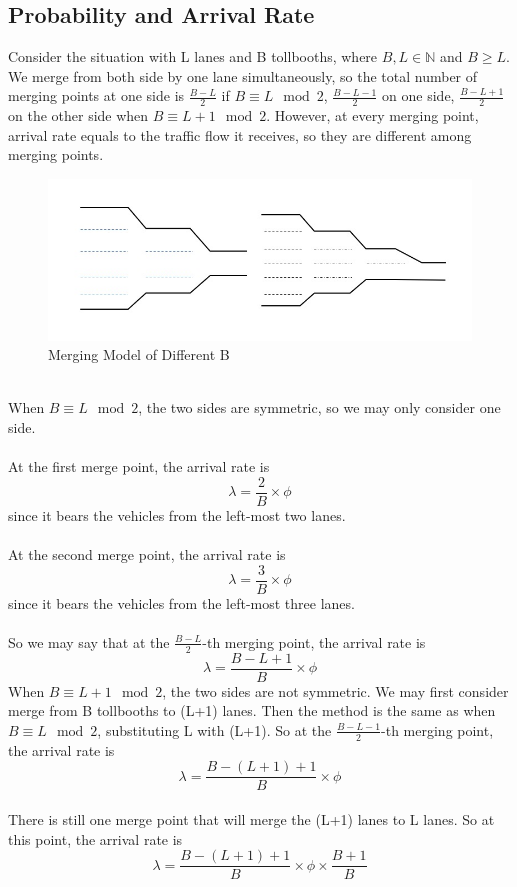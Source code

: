 \subsection{Probability and Arrival Rate}
Consider the situation with L lanes and B tollbooths, where \(B, L \in \mathbb{N}\) and \(B\geqslant L\). We merge from both side by one lane simultaneously, so the total number of merging points at one side is \(\frac{B-L}{2}\) if \(B \equiv L \mod 2\), \(\frac{B-L-1}{2}\) on one side, \(\frac{B-L+1}{2}\) on the other side when \(B \equiv L+1 \mod 2\). However, at every merging point, arrival rate equals to the traffic flow it receives, so they are different among merging points.\\
\begin{figure}[h]
\small
\centering
\includegraphics[width=12cm]{562831237.jpg}
\caption{Merging Model of Different B} \label{fig: Merging Model of Different B}
\end{figure}
\\
When  \(B \equiv L \mod 2\), the two sides are symmetric, so we may only consider one side.\\
\\
At the first merge point, the arrival rate is\\
\[
\lambda = \frac{2}{B} \times \phi
\]
since it bears the vehicles from the left-most two lanes.\\
\\
\noindent
At the second merge point, the arrival rate is\\
\[
\lambda = \frac{3}{B} \times \phi
\]
since it bears the vehicles from the left-most three lanes.\\
\\
So we may say that at the \(\frac{B-L}{2}\)-th merging point, the arrival rate is\\
\[
\lambda = \frac{B-L+1}{B} \times \phi
\]
When \(B \equiv L+1\mod 2\), the two sides are not symmetric. We may first consider merge from B tollbooths to (L+1) lanes. Then the method is the same as when \(B \equiv L \mod 2\), substituting L with (L+1). So at the \(\frac{B-L-1}{2}\)-th merging point, the arrival rate is\\
\[
\lambda = \frac{B-(L+1)+1}{B} \times \phi
\]
\\
There is still one merge point that will merge the (L+1) lanes to L lanes. So at this point, the arrival rate is\\ 
\[
\lambda = \frac{B-(L+1)+1}{B} \times \phi \times \frac{B+1}{B}
\]

